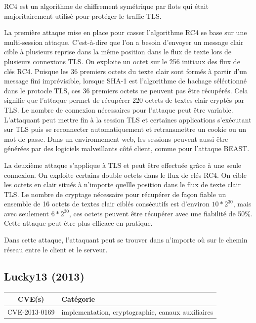 \vspace{1em}


RC4 est un algorithme de chiffrement symétrique par flots qui était majoritairement utilisé pour protéger le traffic TLS.

La première attaque mise en place pour casser l'algorithme RC4 se base sur une multi-session attaque. C'est-à-dire que l'on a besoin d'envoyer un message clair cible à plusieurs reprise dans la même position dans le flux de texte lors de plusieurs connexions TLS. On exploite un octet sur le 256 initiaux des flux de clés RC4. Puisque les 36 premiers octets du texte clair sont formés à partir d'un message fini imprévisible, lorsque SHA-1 est l'algorithme de hachage séléctionné dans le protocle TLS, ces 36 premiers octets ne peuvent pas être récupérés. Cela signifie que l'attaque permet de récupérer 220 octets de textes clair cryptés par TLS. Le nombre de connexion nécessaires pour l'attaque peut être variable. L'attaquant peut mettre fin à la session TLS et certaines applications s'exécutant sur TLS puis se reconnecter automatiquement et retransmettre un cookie ou un mot de passe. Dans un environnement web, les sessions peuvent aussi être générées par des logiciels malveillants côté client, comme pour l'attaque BEAST.

La deuxième attaque s'applique à TLS et peut être effectuée grâce à une seule connexion. On exploite certains double octets dans le flux de clés RC4. On cible les octets en clair situés à n'importe quellle position dans le flux de texte clair TLS. Le nombre de cryptage nécessaire pour récupérer de façon fiable un ensemble de 16 octets de textes clair ciblés consécutifs est d'environ $10*2^{30}$, mais avec seulement $6*2^{30}$, ces octets peuvent être récupérer avec une fiabilité de 50\%. Cette attaque peut être plus efficace en pratique.

Dans cette attaque, l'attaquant peut se trouver dans n'importe où sur le chemin réseau entre le client et le serveur\cite{rc4}.




\subsection{Lucky13 (2013)}

\begin{tabularx}{0.96\textwidth}{|c|X|}
  \hline
  \textbf{CVE(s)} & \textbf{Catégorie} \\
  \hline
  CVE-2013-0169 & implementation, cryptographie, canaux auxiliaires \\
  \hline
\end{tabularx}


